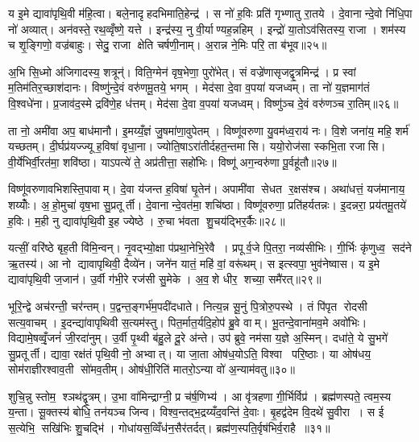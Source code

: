 य इ॒मे द्यावा॑पृथि॒वी म॑हि॒त्वा। बले॒नादृहदभिमाति॒हेन्द्र॑। स नो॑ ह॒विः प्रति॑ गृभ्णातु रा॒तये। दे॒वानान्दे॒वो नि॑धि॒पा नो॑ अव्यात्। अन॑वस्ते॒ रथ॒व्वृँष्णे॒ यत्ते। इन्द्र॑स्य॒ नु वी॒र्याण्यह॒न्नहिम्। इन्द्रो॑ या॒तोऽव॑सितस्य॒ राजा। शम॑स्य च शृ॒ङ्गिणो॒ वज्र॑बाहुः। सेदु॒ राजा क्षेति चर्\mbox{}षणी॒नाम्। अ॒रान्न ने॒मिः परि॒ ता ब॑भूव॥२५॥

अ॒भि सि॒ध्मो अ॑जिगादस्य॒ शत्रून्॑। विति॒ग्मेन॑ वृष॒भेणा॒ पुरो॑भेत्। सं वज्रे॑णासृजद्वृ॒त्रमिन्द्र॑। प्र स्वां म॒तिम॑तिर॒च्छाश॑दानः। विष्णु॑न्दे॒वं वरु॑णमू॒तये॒ भगम्। मेद॑सा दे॒वा व॒पया॑ यजध्वम्। ता नो॑ य॒ज्ञमाग॑तं वि॒श्वधे॑ना। प्र॒जाव॑द॒स्मे द्रवि॑णे॒ह ध॑त्तम्। मेद॑सा दे॒वा व॒पया॑ यजध्वम्। विष्णु॑ञ्च दे॒वं वरु॑णञ्च रा॒तिम्॥२६॥

ता नो॒ अमी॑वा अप॒ बाध॑मानौ। इ॒मय्यँ॒ज्ञं जु॒षमा॑णा॒वुपेतम्। विष्णू॑वरुणा यु॒वम॑ध्व॒राय॑ नः। वि॒शे जना॑य॒ महि॒ शर्म॑ यच्छतम्। दी॒र्घप्र॑यज्ज्यू ह॒विषा॑ वृधा॒ना। ज्योति॒षाऽरा॑तीर्दहत॒न्तमासि। ययो॒रोज॑सा स्कभि॒ता रजासि। वी॒र्ये॑भिर्वी॒रत॑मा॒ शवि॑ष्ठा। याऽपत्ये॑ ते॒ अप्र॑तीत्ता॒ सहो॑भिः। विष्णू॑ अग॒न्वरु॑णा पू॒र्वहू॑तौ॥२७॥

विष्णू॑वरुणावभिशस्ति॒पावाम्। दे॒वा य॑जन्त ह॒विषा॑ घृ॒तेन॑। अपामी॑वा सेधत र॒क्षस॑श्च। अथा॑धत्तं॒ यज॑मानाय॒ शय्योँः। अ॒हो॒मुचा॑ वृष॒भा सु॒प्रतूर्ती। दे॒वानान्दे॒वत॑मा॒ शचि॑ष्ठा। विष्णू॑वरुणा॒ प्रति॑हर्यतन्नः। इ॒दन्नरा॒ प्रय॑तमू॒तये॑ ह॒विः। म॒ही नु द्यावा॑पृथि॒वी इ॒ह ज्येष्ठे। रु॒चा भ॑वता शु॒चय॑द्भिर॒र्कैः॥२८॥

यत्सीं॒ वरि॑ष्ठे बृह॒ती वि॑मि॒न्वन्। नृ॒वद्भ्यो॒क्षा प॑प्रथा॒नेभि॒रेवै। प्रपूर्व॒जे पि॒तरा॒ नव्य॑सीभिः। गी॒र्भिः कृ॑णुध्व॒ सद॑ने ऋ॒तस्य॑। आ नो द्यावापृथिवी॒ दैव्ये॑न। जने॑न यातं॒ महि॑ वां॒ वरू॑थम्। स इत्स्वपा॒ भुव॑नेष्वास। य इ॒मे द्यावा॑पृथि॒वी ज॒जान॑। उ॒र्वी ग॑भी॒रे रज॑सी सु॒मेके। अ॒व॒शे धीर॒ शच्या॒ समै॑रत्॥२९॥

भूरि॒न्द्वे अच॑रन्ती॒ चर॑न्तम्। प॒द्वन्त॒ङ्गर्भ॑म॒पदी॑दधाते। नित्य॒न्न सू॒नुं पि॒त्रोरु॒पस्थे। तं पि॑पृत रोदसी सत्य॒वाचम्। इ॒दन्द्या॑वापृथिवी स॒त्यम॑स्तु। पित॒र्मात॒र्यदि॒होप॑ ब्रु॒वे वाम्। भू॒तन्दे॒वाना॑मव॒मे अवो॑भिः। विद्यामे॒षव्वृँ॒जनं॑ जी॒रदा॑नुम्। उ॒र्वी पृ॒थ्वी ब॑हु॒ले दू॒रे अ॑न्ते। उप॑ ब्रुवे॒ नम॑सा य॒ज्ञे अ॒स्मिन्। दधा॑ते॒ ये सु॒भगे॑ सु॒प्रतूर्ती। द्यावा॒ रक्ष॑तं पृथि॒वी नो॒ अभ्वात्। या जा॒ता ओष॑ध॒योऽति॒ विश्वा परि॒ष्ठाः। या ओष॑धय॒ सोम॑राज्ञीरश्वाव॒ती सो॑मव॒तीम्। ओष॑धी॒रिति॑ मातरो॒ऽन्या वो॑ अ॒न्याम॑वतु॥३०॥\anuvakamend[ह॒विर्नो॑ दाद्भभूव रा॒तिं पू॒र्वहू॑ताव॒र्कैरै॑रद॒स्मिन्पञ्च॑ च]

शुचि॒न्नु स्तोम॒ श्ञथ॑द्वृ॒त्रम्। उ॒भा वा॑मिन्द्राग्नी॒ प्र च॑र्\mbox{}ष॒णिभ्य॑। आ वृ॑त्रहणा गी॒र्भिर्विप्र॑। ब्रह्म॑णस्पते॒ त्वम॒स्य य॒न्ता। सू॒क्तस्य॑ बोधि॒ तन॑यञ्च जिन्व। विश्व॒न्तद्भ॒द्रय्यँद॒वन्ति॑ दे॒वाः। बृ॒हद्व॑देम वि॒दथे॑ सु॒वीरा। स ई स॒त्येभि॒ सखि॑भिः शु॒चद्भि॑। गोधा॑यस॒व्विँध॑न॒सैर॑तर्दत्। ब्रह्म॑ण॒स्पति॒र्वृष॑भिर्व॒राहै॥३१॥

